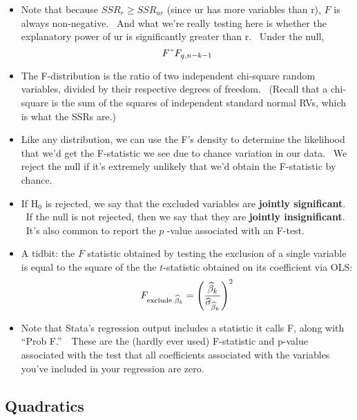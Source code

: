 \documentclass[11pt]{article}
\begin{document}
\begin{itemize}
\item Note that because $SSR_{r}\geq SSR_{ur}$ (since ur has more variables
than r), $F$ is always non-negative. \ And what we're really testing here is
whether the explanatory power of ur is significantly greater than r. \ Under
the null, 
\begin{equation*}
F\symbol{126}F_{q,n-k-1}
\end{equation*}

\item The F-distribution is the ratio of two independent chi-square random
variables, divided by their respective degrees of freedom. \ (Recall that a
chi-square is the sum of the squares of independent standard normal RVs,
which is what the SSRs are.)

\item Like any distribution, we can use the F's density to determine the
likelihood that we'd get the F-statistic we see due to chance variation in
our data. \ We reject the null if it's extremely unlikely that we'd obtain
the F-statistic by chance.

\item If H$_{0}$ is rejected, we say that the excluded variables are \textbf{%
jointly significant}. \ If the null is not rejected, then we say that they
are \textbf{jointly insignificant}. \ It's also common to report the $p$%
-value associated with an F-test.

\item A tidbit: the $F$ statistic obtained by testing the exclusion of a
single variable is equal to the square of the the $t$-statistic obtained on
its coefficient via OLS:%
\begin{equation*}
F_{\text{exclude }\widehat{\beta }_{k}}=\left( \frac{\widehat{\beta }_{k}}{%
\widehat{\sigma }_{\widehat{\beta }_{k}}}\right) ^{2}
\end{equation*}

\item Note that Stata's regression output includes a statistic it calls F,
along with \textquotedblleft Prob \TEXTsymbol{>}F.\textquotedblright\ \
These are the (hardly ever used) F-statistic and p-value associated with the
test that all coefficients associated with the variables you've included in
your regression are zero.
\end{itemize}

\subsection{Quadratics}
\end{document}
